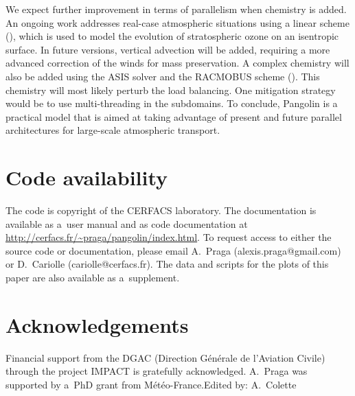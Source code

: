    We expect further improvement in terms of parallelism when chemistry is
   added. An ongoing work addresses real-case atmospheric situations using a
   linear scheme (\cite{Cariolle2007}), which is used to model the evolution of
   stratospheric ozone on an isentropic surface. In future versions, vertical
   advection will be added, requiring a more advanced correction of the winds
   for mass preservation. A complex chemistry will also be added using the ASIS
   solver and the RACMOBUS scheme (\cite{Dufour2005}). This chemistry will most
   likely perturb the load balancing. One mitigation strategy would be to use
   multi-threading in the subdomains. To conclude, Pangolin is a practical
   model that is aimed at taking advantage of present and future parallel
   architectures for large-scale atmospheric transport.


   \section*{Code availability}

   The code is copyright of the CERFACS laboratory. The
   documentation is available as a~user manual and as code
   documentation at
   \url{http://cerfacs.fr/~praga/pangolin/index.html}.  To request
   access to either the source code or documentation, please email A.~Praga (alexis.praga@gmail.com) or D.~Cariolle
    (cariolle@cerfacs.fr).  The data and scripts for the plots of this
   paper are also available as a~supplement.

   \section*{Acknowledgements}
  Financial support from the DGAC (Direction G\'en\'erale de l'Aviation Civile)
  through the project IMPACT is gratefully acknowledged. A.~Praga was supported
  by a~PhD grant from M\'et\'eo-France.\newline\newline Edited by: A.~Colette
